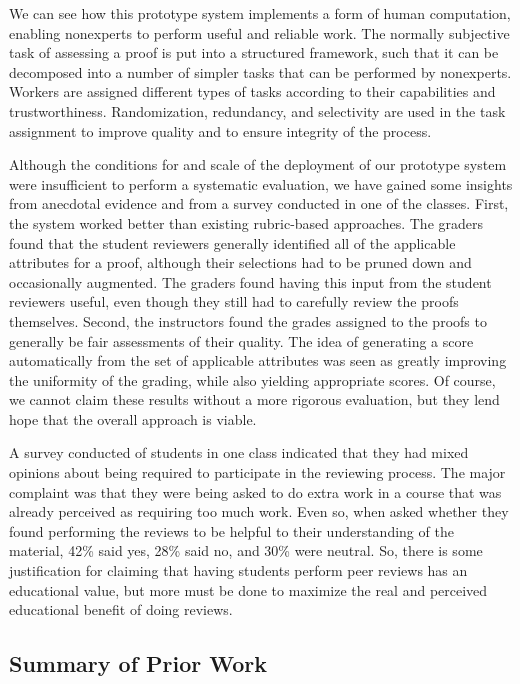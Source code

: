 \documentclass[12pt]{article}
\begin{document}
We can see how this prototype system implements a form of human computation,
enabling nonexperts to perform useful and reliable work.  The normally
subjective task of assessing a proof is put into a structured
framework, such that it can be decomposed into a number of simpler
tasks that can be performed by nonexperts.  Workers are assigned
different types of tasks according to their capabilities and trustworthiness.
Randomization, redundancy, and selectivity are used in the task assignment to
improve quality and to ensure integrity of the process.

Although the conditions for and scale of the deployment of our
prototype system were insufficient to perform a systematic evaluation,
we have gained some insights from anecdotal evidence and from a survey
conducted in one of the classes.  First, the system worked better than existing
rubric-based approaches.
The graders found that the student
reviewers generally identified all of the applicable attributes for a
proof, although their selections had to be pruned down and
occasionally augmented.  The graders found having this input from the
student reviewers useful, even though they still had to carefully
review the proofs themselves.  Second, the instructors found the
grades assigned to the proofs to generally be fair assessments of
their quality.  The idea of generating a score automatically from the
set of applicable attributes was seen as greatly improving the
uniformity of the grading, while also yielding appropriate scores.
Of course, we cannot claim these results without a more rigorous
evaluation, but they lend hope that the overall approach is viable.

A survey conducted of students in one class indicated that they had
mixed opinions about being required to participate in the reviewing
process.  The major complaint was that they were being asked to do
extra work in a course that was already perceived as requiring too much
work.  Even so, when asked whether they found performing the reviews
to be helpful to their understanding of the material, 42\% said yes,
28\% said no, and 30\% were neutral.  So, there is some justification
for claiming that having students perform peer reviews has an educational
value, but more must be done to maximize the real and perceived
educational benefit of doing reviews.

\subsection{Summary of Prior Work}
\end{document}
